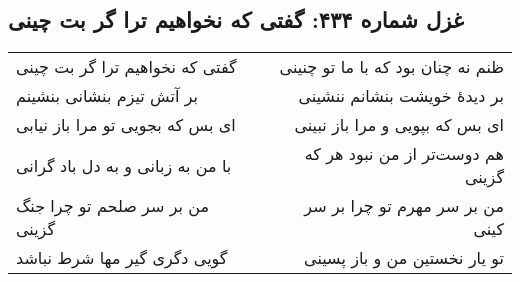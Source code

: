 \begin{center}
\section*{غزل شماره ۴۳۴: گفتی که نخواهیم ترا گر بت چینی}
\label{sec:434}
\begin{longtable}{l p{0.5cm} r}
گفتی که نخواهیم ترا گر بت چینی
&&
ظنم نه چنان بود که با ما تو چنینی
\\
بر آتش تیزم بنشانی بنشینم
&&
بر دیدهٔ خویشت بنشانم ننشینی
\\
ای بس که بجویی تو مرا باز نیابی
&&
ای بس که بپویی و مرا باز نبینی
\\
با من به زبانی و به دل باد گرانی
&&
هم دوست‌تر از من نبود هر که گزینی
\\
من بر سر صلحم تو چرا جنگ گزینی
&&
من بر سر مهرم تو چرا بر سر کینی
\\
گویی دگری گیر مها شرط نباشد
&&
تو یار نخستین من و باز پسینی
\\
\end{longtable}
\end{center}
